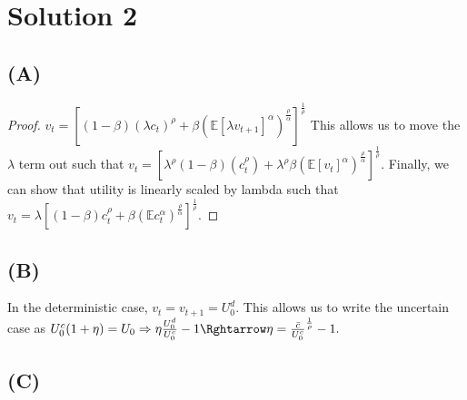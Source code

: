 \documentclass[10pt,a4paper]{article}
\begin{document}
\section*{Solution 2}
  \subsection*{(A)}
    \begin{proof}
      $v_t = [(1-\beta)(\lambda c_t)^{\rho} + \beta(\mathbb{E}[\lambda v_{t+1}]^{\alpha})^{\frac{\rho}{\alpha}}]^{\frac{1}{\rho}}$  This allows us to move the $\lambda$ term out such that $v_t = [\lambda^{\rho}(1-\beta)(c_t^{\rho}) + \lambda^{\rho}\beta(\mathbb{E}[v_t]^{\alpha})^{\frac{\rho}{\alpha}}]^{\frac{1}{\rho}}$. Finally, we can show that utility is linearly scaled by lambda such that $v_t = \lambda[(1-\beta)c_t^{\rho}+\beta(\mathbb{E}c_t^{\alpha})^{\frac{\rho}{\alpha}}]^{\frac{1}{\rho}}$.
    \end{proof}
  \subsection*{(B)}
    In the deterministic case, $v_t=v_{t+1}=U_0^d$. This allows us to write the uncertain case as $U_0^c(1+\eta)=U_0 \Rightarrow \eta \frac{U_0^d}{U_0^c}-1\Rghtarrow \eta = \frac{\bar{c}}{U_0^c}^{\frac{1}{\rho}}-1.$ 
  \subsection*{(C)}
    
\end{document}
